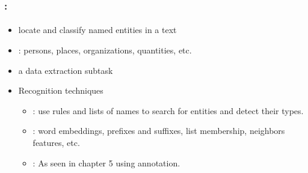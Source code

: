\documentclass[xcolor=table]{beamer}
\begin{document}
\begin{frame}
	\frametitle{\insertshortsubtitle: \insertsection}
	\framesubtitle{\insertsubsection}
	
	\begin{itemize}
		\item locate and classify named entities in a text
		\item {}: persons, places, organizations, quantities, etc.
		\item a data extraction subtask
		\item Recognition techniques
		\begin{itemize}
			\item {}: use rules and lists of names to search for entities and detect their types.
			\item {}: word embeddings, prefixes and suffixes, list membership, neighbors features, etc.
			\item {}: As seen in chapter 5 using  annotation.
			
		\end{itemize}
	\end{itemize}
	
\end{frame}


\end{document}
